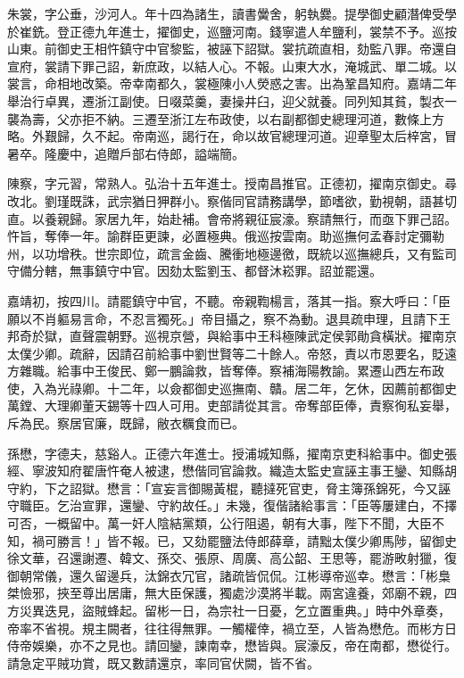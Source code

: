 \begin{pinyinscope}
朱裳，字公垂，沙河人。年十四為諸生，讀書黌舍，躬執爨。提學御史顧潛俾受學於崔銑。登正德九年進士，擢御史，巡鹽河南。錢寧遣人牟鹽利，裳禁不予。巡按山東。前御史王相忤鎮守中官黎監，被誣下詔獄。裳抗疏直相，劾監八罪。帝還自宣府，裳請下罪己詔，新庶政，以結人心。不報。山東大水，淹城武、單二城。以裳言，命相地改築。帝幸南都久，裳極陳小人熒惑之害。出為鞏昌知府。嘉靖二年舉治行卓異，遷浙江副使。日啜菜羹，妻操井臼，迎父就養。同列知其貧，製衣一襲為壽，父亦拒不納。三遷至浙江左布政使，以右副都御史總理河道，數條上方略。外艱歸，久不起。帝南巡，謁行在，命以故官總理河道。迎章聖太后梓宮，冒暑卒。隆慶中，追贈戶部右侍郎，謚端簡。

陳察，字元習，常熟人。弘治十五年進士。授南昌推官。正德初，擢南京御史。尋改北。劉瑾既誅，武宗猶日狎群小。察偕同官請務講學，節嗜欲，勤視朝，語甚切直。以養親歸。家居九年，始赴補。會帝將親征宸濠。察請無行，而亟下罪己詔。忤旨，奪俸一年。諭群臣更諫，必置極典。俄巡按雲南。助巡撫何孟春討定彌勒州，以功增秩。世宗即位，疏言金齒、騰衝地極邊徼，既統以巡撫總兵，又有監司守備分轄，無事鎮守中官。因劾太監劉玉、都督沐崧罪。詔並罷還。

嘉靖初，按四川。請罷鎮守中官，不聽。帝親鞫楊言，落其一指。察大呼曰：「臣願以不肖軀易言命，不忍言獨死。」帝目攝之，察不為動。退具疏申理，且請下王邦奇於獄，直聲震朝野。巡視京營，與給事中王科極陳武定侯郭勛貪橫狀。擢南京太僕少卿。疏辭，因請召前給事中劉世賢等二十餘人。帝怒，責以市恩要名，貶遠方雜職。給事中王俊民、鄭一鵬論救，皆奪俸。察補海陽教諭。累遷山西左布政使，入為光祿卿。十二年，以僉都御史巡撫南、贛。居二年，乞休，因薦前都御史萬鏜、大理卿董天錫等十四人可用。吏部請從其言。帝奪部臣俸，責察徇私妄舉，斥為民。察居官廉，既歸，敝衣糲食而已。

孫懋，字德夫，慈谿人。正德六年進士。授浦城知縣，擢南京吏科給事中。御史張經、寧波知府翟唐忤奄人被逮，懋偕同官論救。織造太監史宣誣主事王鑾、知縣胡守約，下之詔獄。懋言：「宣妄言御賜黃棍，聽撻死官吏，脅主簿孫錦死，今又誣守職臣。乞治宣罪，還鑾、守約故任。」未幾，復偕諸給事言：「臣等屢建白，不擇可否，一概留中。萬一奸人陰結黨類，公行阻遏，朝有大事，陛下不聞，大臣不知，禍可勝言！」皆不報。已，又劾罷鹽法侍郎薛章，請黜太僕少卿馬陟，留御史徐文華，召還謝遷、韓文、孫交、張原、周廣、高公韶、王思等，罷游畋射獵，復御朝常儀，還久留邊兵，汰錦衣冗官，諸疏皆侃侃。江彬導帝巡幸。懋言：「彬梟桀憸邪，挾至尊出居庸，無大臣保護，獨處沙漠將半載。兩宮違養，郊廟不親，四方災異迭見，盜賊蜂起。留彬一日，為宗社一日憂，乞立置重典。」時中外章奏，帝率不省視。規主闕者，往往得無罪。一觸權倖，禍立至，人皆為懋危。而彬方日侍帝娛樂，亦不之見也。請回鑾，諫南幸，懋皆與。宸濠反，帝在南都，懋從行。請急定平賊功賞，既又數請還京，率同官伏闕，皆不省。


\end{pinyinscope}
